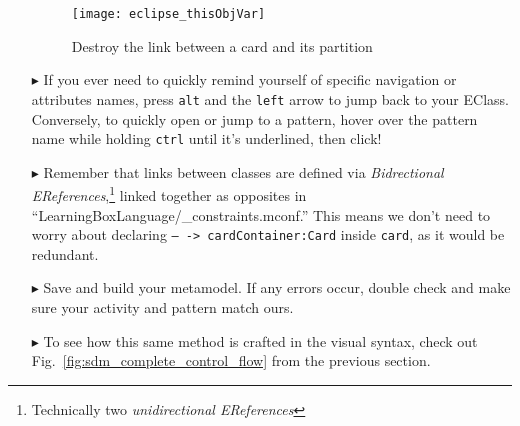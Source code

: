 \begin{itemize}
\vspace{0.5cm}

\begin{figure}[htp]
\begin{center}
  \texttt{[image: eclipse\_thisObjVar]}
  \caption{Destroy the link between a card and its partition}
  \label{fig:deleteReference}
\end{center}
\end{figure}

\item[$\blacktriangleright$] If you ever need to quickly remind yourself of specific navigation or attributes names, press \texttt{alt} and the \texttt{left}
arrow to jump back to your EClass. Conversely, to quickly open or jump to a pattern, hover over the pattern name while holding \texttt{ctrl} until it's
underlined, then click!

\vspace{0.5cm}

\item[$\blacktriangleright$] Remember that links between classes are defined via \emph{Bidrectional EReferences},\footnote{Technically two
\emph{unidirectional EReferences}} linked together as opposites in ``LearningBoxLanguage/\_con\-straints.mconf.'' This means we don't need to worry about
declaring \texttt{-- -> cardContainer:Card} inside \texttt{card}, as it would be redundant.

\vspace{0.5cm}

\item[$\blacktriangleright$] Save and build your metamodel. If any errors occur, double check and make sure your activity and pattern match ours. 

\vspace{0.5cm}

\item[$\blacktriangleright$] To see how this same method is crafted in the visual syntax, check out Fig.~\ref{fig:sdm_complete_control_flow} from the previous
section.

\end{itemize}
